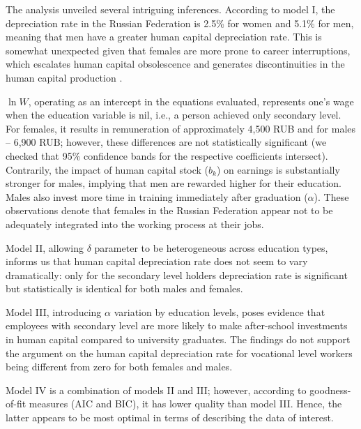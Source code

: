 \documentclass[12pt,a4paper]{article}
\numberwithin{equation}{section}
\begin{document}
The analysis unveiled several intriguing inferences. According to model I, the depreciation rate in the Russian Federation is 2.5\% for women and 5.1\% for men, meaning that men have a greater human capital depreciation rate. This is somewhat unexpected given that females are more prone to career interruptions, which escalates human capital obsolescence and generates discontinuities in the human capital production \parencite{weber_173._2008}.

$\ln W$, operating as an intercept in the equations evaluated, represents one's wage when the education variable is nil, i.e., a person achieved only secondary level. For females, it results in remuneration of approximately 4,500 RUB and for males -- 6,900 RUB; however, these differences are not statistically significant (we checked that 95\% confidence bands for the respective coefficients intersect). Contrarily, the impact of human capital stock ($b_k$) on earnings is substantially stronger for males, implying that men are rewarded higher for their education. Males also invest more time in training immediately after graduation ($\alpha$). These observations denote that females in the Russian Federation appear not to be adequately integrated into the working process at their jobs. 

Model II, allowing $\delta$ parameter to be heterogeneous across education types, informs us that human capital depreciation rate does not seem to vary dramatically: only for the secondary level holders depreciation rate is significant but statistically is identical for both males and females. 

Model III, introducing $\alpha$ variation by education levels, poses evidence that employees with secondary level are more likely to make after-school investments in human capital compared to university graduates. The findings do not support the argument on the human capital depreciation rate for vocational level workers being different from zero for both females and males.

Model IV is a combination of models II and III; however, according to goodness-of-fit measures (AIC and BIC), it has lower quality than model III. Hence, the latter appears to be most optimal in terms of describing the data of interest.
\end{document}
